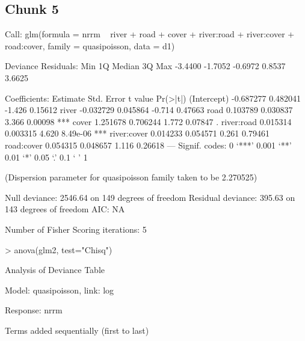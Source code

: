 \documentclass{article}
\begin{document}
\subsection{Chunk 5}
\begin{Schunk}
\begin{Soutput}
Call:
glm(formula = nrrm ~ river + road + cover + river:road + river:cover + 
    road:cover, family = quasipoisson, data = d1)

Deviance Residuals: 
    Min       1Q   Median       3Q      Max  
-3.4400  -1.7052  -0.6972   0.8537   3.6625  

Coefficients:
             Estimate Std. Error t value Pr(>|t|)    
(Intercept) -0.687277   0.482041  -1.426  0.15612    
river       -0.032729   0.045864  -0.714  0.47663    
road         0.103789   0.030837   3.366  0.00098 ***
cover        1.251678   0.706244   1.772  0.07847 .  
river:road   0.015314   0.003315   4.620 8.49e-06 ***
river:cover  0.014233   0.054571   0.261  0.79461    
road:cover   0.054315   0.048657   1.116  0.26618    
---
Signif. codes:  0 ‘***’ 0.001 ‘**’ 0.01 ‘*’ 0.05 ‘.’ 0.1 ‘ ’ 1

(Dispersion parameter for quasipoisson family taken to be 2.270525)

    Null deviance: 2546.64  on 149  degrees of freedom
Residual deviance:  395.63  on 143  degrees of freedom
AIC: NA

Number of Fisher Scoring iterations: 5
\end{Soutput}
\begin{Sinput}
> anova(glm2, test="Chisq")
\end{Sinput}
\begin{Soutput}
Analysis of Deviance Table

Model: quasipoisson, link: log

Response: nrrm

Terms added sequentially (first to last)



\end{Soutput}
\end{Schunk}
\end{document}
